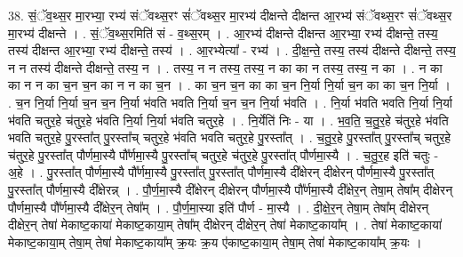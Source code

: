 \documentclass[17pt]{extarticle}
\begin{document}
38. सं॒ॅव॒थ्स॒र मा॒रभ्या॒ रभ्य॑ संॅवथ्स॒रꣳ सं॑ॅवथ्स॒र मा॒रभ्य॑ दीक्षन्ते दीक्षन्त आ॒रभ्य॑ संॅवथ्स॒रꣳ सं॑ॅवथ्स॒र मा॒रभ्य॑ दीक्षन्ते । . सं॒ॅव॒थ्स॒रमिति॑ सं - व॒थ्स॒रम् । . आ॒रभ्य॑ दीक्षन्ते दीक्षन्त आ॒रभ्या॒ रभ्य॑ दीक्षन्ते॒ तस्य॒ तस्य॑ दीक्षन्त आ॒रभ्या॒ रभ्य॑ दीक्षन्ते॒ तस्य॑ । . आ॒रभ्येत्या᳚ - रभ्य॑ । . दी॒क्ष॒न्ते॒ तस्य॒ तस्य॑ दीक्षन्ते दीक्षन्ते॒ तस्य॒ न न तस्य॑ दीक्षन्ते दीक्षन्ते॒ तस्य॒ न । . तस्य॒ न न तस्य॒ तस्य॒ न का का न तस्य॒ तस्य॒ न का । . न का का न न का च॒न च॒न का न न का च॒न । . का च॒न च॒न का का च॒न नि॒र्या नि॒र्या च॒न का का च॒न नि॒र्या । . च॒न नि॒र्या नि॒र्या च॒न च॒न नि॒र्या भ॑वति भवति नि॒र्या च॒न च॒न नि॒र्या भ॑वति । . नि॒र्या भ॑वति भवति नि॒र्या नि॒र्या भ॑वति चतुर॒हे च॑तुर॒हे भ॑वति नि॒र्या नि॒र्या भ॑वति चतुर॒हे । . नि॒र्येति॑ निः - या । . भ॒व॒ति॒ च॒तु॒र॒हे च॑तुर॒हे भ॑वति भवति चतुर॒हे पु॒रस्ता᳚त् पु॒रस्ता᳚च् चतुर॒हे भ॑वति भवति चतुर॒हे पु॒रस्ता᳚त् । . च॒तु॒र॒हे पु॒रस्ता᳚त् पु॒रस्ता᳚च् चतुर॒हे च॑तुर॒हे पु॒रस्ता᳚त् पौर्णमा॒स्यै पौ᳚र्णमा॒स्यै पु॒रस्ता᳚च् चतुर॒हे च॑तुर॒हे पु॒रस्ता᳚त् पौर्णमा॒स्यै । . च॒तु॒र॒ह इति॑ चतुः - अ॒हे । . पु॒रस्ता᳚त् पौर्णमा॒स्यै पौ᳚र्णमा॒स्यै पु॒रस्ता᳚त् पु॒रस्ता᳚त् पौर्णमा॒स्यै दी᳚क्षेरन् दीक्षेरन् पौर्णमा॒स्यै पु॒रस्ता᳚त् पु॒रस्ता᳚त् पौर्णमा॒स्यै दी᳚क्षेरन्न् । . पौ॒र्ण॒मा॒स्यै दी᳚क्षेरन् दीक्षेरन् पौर्णमा॒स्यै पौ᳚र्णमा॒स्यै दी᳚क्षेर॒न् तेषा॒म् तेषा᳚म् दीक्षेरन् पौर्णमा॒स्यै पौ᳚र्णमा॒स्यै दी᳚क्षेर॒न् तेषा᳚म् । . पौ॒र्ण॒मा॒स्या इति॑ पौर्ण - मा॒स्यै । . दी॒क्षे॒र॒न् तेषा॒म् तेषा᳚म् दीक्षेरन् दीक्षेर॒न् तेषा॑ मेकाष्ट॒काया॑ मेकाष्ट॒काया॒म् तेषा᳚म् दीक्षेरन् दीक्षेर॒न् तेषा॑ मेकाष्ट॒काया᳚म् । . तेषा॑ मेकाष्ट॒काया॑ मेकाष्ट॒काया॒म् तेषा॒म् तेषा॑ मेकाष्ट॒काया᳚म् क्र॒यः क्र॒य ए॑काष्ट॒काया॒म् तेषा॒म् तेषा॑ मेकाष्ट॒काया᳚म् क्र॒यः । \newline
\end{document}
